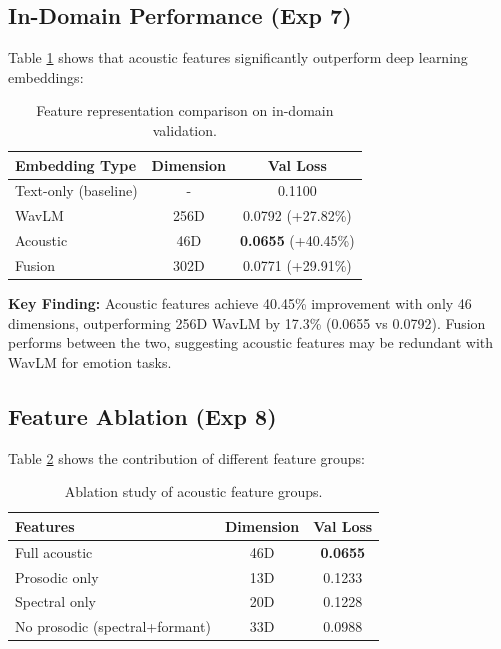 \subsection{In-Domain Performance (Exp 7)}

Table \ref{tab:feature_comparison} shows that acoustic features significantly outperform deep learning embeddings:

\begin{table}[h]
\centering
\caption{Feature representation comparison on in-domain validation.}
\label{tab:feature_comparison}
\begin{tabular}{lcc}
\toprule
\textbf{Embedding Type} & \textbf{Dimension} & \textbf{Val Loss} \\
\midrule
Text-only (baseline) & - & 0.1100 \\
WavLM & 256D & 0.0792 (+27.82\%) \\
Acoustic & 46D & \textbf{0.0655} (+40.45\%) \\
Fusion & 302D & 0.0771 (+29.91\%) \\
\bottomrule
\end{tabular}
\end{table}

\textbf{Key Finding:} Acoustic features achieve 40.45\% improvement with only 46 dimensions, outperforming 256D WavLM by 17.3\% (0.0655 vs 0.0792). Fusion performs between the two, suggesting acoustic features may be redundant with WavLM for emotion tasks.

\subsection{Feature Ablation (Exp 8)}

Table \ref{tab:ablation} shows the contribution of different feature groups:

\begin{table}[h]
\centering
\caption{Ablation study of acoustic feature groups.}
\label{tab:ablation}
\begin{tabular}{lcc}
\toprule
\textbf{Features} & \textbf{Dimension} & \textbf{Val Loss} \\
\midrule
Full acoustic & 46D & \textbf{0.0655} \\
Prosodic only & 13D & 0.1233 \\
Spectral only & 20D & 0.1228 \\
No prosodic (spectral+formant) & 33D & 0.0988 \\
\bottomrule
\end{tabular}
\end{table}

